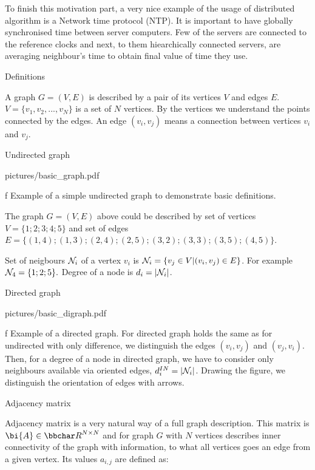 To finish this motivation part, a very nice example of the usage of distributed algorithm is a Network time protocol (NTP). It is important to have globally synchronised time between server computers. Few of the servers are connected to the reference clocks and next, to them hiearchically connected servers, are averaging neighbour's time to obtain final value of time they use.


\sec Definitions

A graph $G=(V, E)$ is described by a pair of its vertices $V$ and edges $E$. ${V=\{ v_1, v_2, ..., v_N \}}$ is a set of $N$ vertices. By the vertices we understand the points connected by the edges. 
An edge $\left( v_i, v_j \right)$ means a connection between vertices $v_i$ and $v_j$.

\secc Undirected graph

\midinsert
\picw=8cm \cinspic pictures/basic_graph.pdf
\caption/f Example of a simple undirected graph to demonstrate basic definitions. 
\endinsert

The graph $G=(V, E)$ above could be described by set of vertices ${V=\{ 1; 2; 3; 4; 5\}}$ and set of edges  $E=\{ (1, 4); (1, 3); (2, 4); (2,5); (3, 2); (3, 3); (3, 5); (4, 5) \}$.

Set of neigbours $ {\cal{N}}_i $ of a vertex $v_i$ is $ {\cal{N}}_i = \{ v_j \in V | (v_i , v_j)\in E \} $. For example $ {\cal{N}}_4 = \{1; 2; 5 \} .$ Degree of a node is  $d_i= |{\cal{N}}_i |$.

\secc Directed graph

\midinsert
\picw=10cm \cinspic pictures/basic_digraph.pdf
\caption/f Example of a directed graph. 
\endinsert
For directed graph holds the same as for undirected with only difference, we distinguish the edges 
$ ( v_i, v_j ) $ and $ ( v_j, v_i ) . $ Then, for a degree of a node in directed graph, we have to consider only neighbours available via oriented edges,  $d_i^{IN}= |{\cal{N}}_i |$. Drawing the figure, we distinguish the orientation of edges with arrows.




\secc Adjacency matrix 

Adjacency matrix is a very natural way of a full graph description. This matrix is ${\bi{A}} \in {\bbchar R}^{N\times{N}}$ and for graph $G$ with $N$ vertices describes inner connectivity of the graph with information, to what all vertices goes an edge from a given vertex.  Its values $a_{i,j}$ are defined as: 



